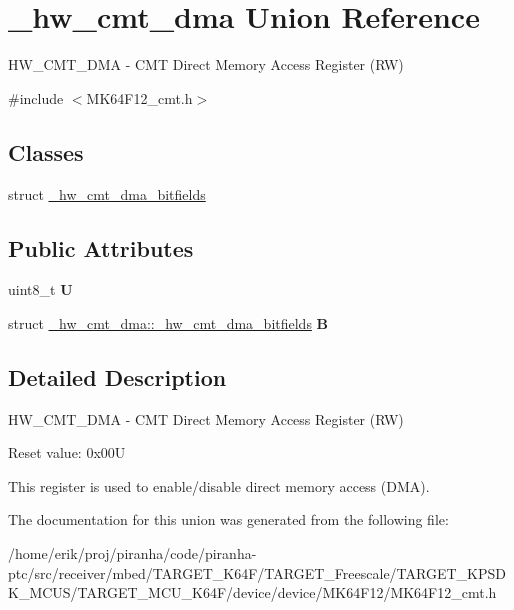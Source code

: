 \hypertarget{union__hw__cmt__dma}{}\section{\+\_\+hw\+\_\+cmt\+\_\+dma Union Reference}
\label{union__hw__cmt__dma}


H\+W\+\_\+\+C\+M\+T\+\_\+\+D\+MA -\/ C\+MT Direct Memory Access Register (RW)  




{\ttfamily \#include $<$M\+K64\+F12\+\_\+cmt.\+h$>$}

\subsection*{Classes}
\begin{DoxyCompactItemize}
\item 
struct \hyperlink{struct__hw__cmt__dma_1_1__hw__cmt__dma__bitfields}{\+\_\+hw\+\_\+cmt\+\_\+dma\+\_\+bitfields}
\end{DoxyCompactItemize}
\subsection*{Public Attributes}
\begin{DoxyCompactItemize}
\item 
uint8\+\_\+t {\bfseries U}\hypertarget{union__hw__cmt__dma_a2b9aa48dc1296296c8eaa345d59b530a}{}\label{union__hw__cmt__dma_a2b9aa48dc1296296c8eaa345d59b530a}

\item 
struct \hyperlink{struct__hw__cmt__dma_1_1__hw__cmt__dma__bitfields}{\+\_\+hw\+\_\+cmt\+\_\+dma\+::\+\_\+hw\+\_\+cmt\+\_\+dma\+\_\+bitfields} {\bfseries B}\hypertarget{union__hw__cmt__dma_abc62b9b29a12e32ba5251253ab6e8604}{}\label{union__hw__cmt__dma_abc62b9b29a12e32ba5251253ab6e8604}

\end{DoxyCompactItemize}


\subsection{Detailed Description}
H\+W\+\_\+\+C\+M\+T\+\_\+\+D\+MA -\/ C\+MT Direct Memory Access Register (RW) 

Reset value\+: 0x00U

This register is used to enable/disable direct memory access (D\+MA). 

The documentation for this union was generated from the following file\+:\begin{DoxyCompactItemize}
\item 
/home/erik/proj/piranha/code/piranha-\/ptc/src/receiver/mbed/\+T\+A\+R\+G\+E\+T\+\_\+\+K64\+F/\+T\+A\+R\+G\+E\+T\+\_\+\+Freescale/\+T\+A\+R\+G\+E\+T\+\_\+\+K\+P\+S\+D\+K\+\_\+\+M\+C\+U\+S/\+T\+A\+R\+G\+E\+T\+\_\+\+M\+C\+U\+\_\+\+K64\+F/device/device/\+M\+K64\+F12/M\+K64\+F12\+\_\+cmt.\+h\end{DoxyCompactItemize}
